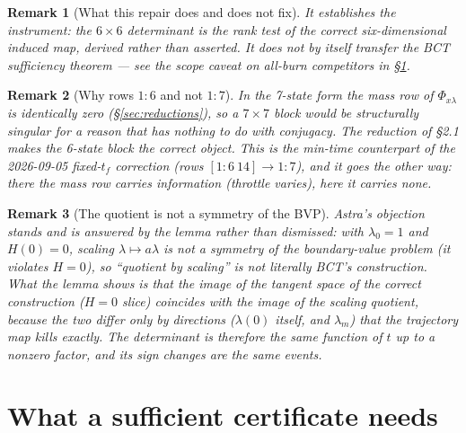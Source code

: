 \documentclass[11pt]{article}
\newtheorem{remark}{Remark}
\theoremstyle{definition}
\newcommand{\lm}{\lambda_m}
\newcommand{\Phixl}{\Phi_{x\lambda}}
\newcommand{\tf}{t_f}
\begin{document}
\begin{remark}[What this repair does and does not fix]
It establishes the \emph{instrument}: the $6\times6$ determinant is the rank
test of the correct six-dimensional induced map, derived rather than asserted.
It does \emph{not} by itself transfer the BCT sufficiency theorem --- see the
scope caveat on all-burn competitors in \S\ref{sec:hyp}.
\end{remark}

\begin{remark}[Why rows $1{:}6$ and not $1{:}7$]
In the 7-state form the mass row of $\Phixl$ is identically zero
(\S\ref{sec:reductions}), so a $7\times7$ block would be structurally singular
for a reason that has nothing to do with conjugacy. The reduction of
\S2.1 makes the 6-state block the correct object. This is the min-time
counterpart of the 2026-09-05 fixed-$\tf$ correction (rows $[1{:}6\ 14]\to1{:}7$),
and it goes the \emph{other} way: there the mass row carries information
(throttle varies), here it carries none.
\end{remark}

\begin{remark}[The quotient is not a symmetry of the BVP]
Astra's objection stands and is answered by the lemma rather than dismissed:
with $\lambda_0=1$ and $H(0)=0$, scaling $\lambda\mapsto a\lambda$ is not a
symmetry of the boundary-value problem (it violates $H=0$), so ``quotient by
scaling'' is not literally BCT's construction. What the lemma shows is that the
\emph{image} of the tangent space of the correct construction ($H=0$ slice)
coincides with the image of the scaling quotient, because the two differ only
by directions ($\lambda(0)$ itself, and $\lm$) that the trajectory map kills
exactly. The determinant is therefore the same function of $t$ up to a nonzero
factor, and its sign changes are the same events.
\end{remark}

\section{What a sufficient certificate needs}\label{sec:hyp}
\end{document}
